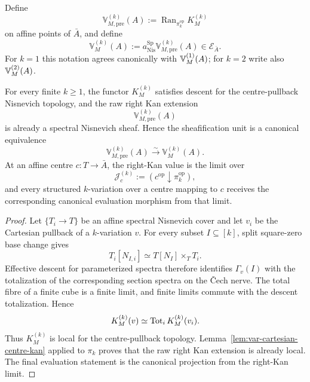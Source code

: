 \begin{definition}
\label{def:var-k-coefficient}
Define
\[
    \mathbb V^{(k)}_{M,\mathrm{pre}}(A)
    :=
    \operatorname{Ran}_{\pi_k^{\mathrm{op}}}K_M^{(k)}
\]
on affine points of \(\bar A\), and define
\[
    \boxed{
    \mathbb V^{(k)}_M(A)
    :=
    a_{\mathrm{Nis}}^{\operatorname{Sp}}
    \mathbb V^{(k)}_{M,\mathrm{pre}}(A)
    \in\mathcal E_{\bar A}.
    }
\]
For \(k=1\) this notation agrees canonically with \(\mathbb V^{(1)}_M(A)\); for \(k=2\) write also \(\mathbb V^{(2)}_M(A)\).
\end{definition}

\begin{theorem}
\label{thm:var-k-kan-sheaf}
For every finite \(k\ge1\), the functor \(K_M^{(k)}\) satisfies descent for the centre-pullback Nisnevich topology, and the raw right Kan extension
\[
    \mathbb V^{(k)}_{M,\mathrm{pre}}(A)
\]
is already a spectral Nisnevich sheaf. Hence the sheafification unit is a canonical equivalence
\[
    \boxed{
    \mathbb V^{(k)}_{M,\mathrm{pre}}(A)
    \xrightarrow{\sim}
    \mathbb V^{(k)}_M(A).
    }
\]
At an affine centre \(c:T\to\bar A\), the right-Kan value is the limit over
\[
    \mathcal J_c^{(k)}
    :=
    (c^{\mathrm{op}}\downarrow\pi_k^{\mathrm{op}}),
\]
and every structured \(k\)-variation over a centre mapping to \(c\) receives the corresponding canonical evaluation morphism from that limit.
\end{theorem}

\begin{proof}
Let \(\{T_i\to T\}\) be an affine spectral Nisnevich cover and let \(v_i\) be the Cartesian pullback of a \(k\)-variation \(v\). For every subset \(I\subseteq[k]\), split square-zero base change gives
\[
    T_i[N_{I,i}]
    \simeq
    T[N_I]\times_TT_i.
\]
Effective descent for parameterized spectra therefore identifies \(\Gamma_v(I)\) with the totalization of the corresponding section spectra on the Čech nerve. The total fibre of a finite cube is a finite limit, and finite limits commute with the descent totalization. Hence
\[
    K_M^{(k)}(v)
    \simeq
    \operatorname{Tot}_iK_M^{(k)}(v_i).
\]
Thus \(K_M^{(k)}\) is local for the centre-pullback topology. Lemma~\ref{lem:var-cartesian-centre-kan} applied to \(\pi_k\) proves that the raw right Kan extension is already local. The final evaluation statement is the canonical projection from the right-Kan limit.
\end{proof}

